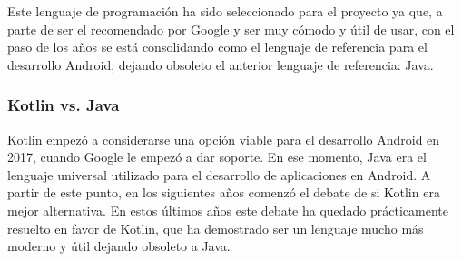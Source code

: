 Este lenguaje de programación ha sido seleccionado para el proyecto ya que, a parte de ser el recomendado por Google y ser muy cómodo y útil de usar, con el paso de los años se está consolidando como el lenguaje de referencia para el desarrollo Android, dejando obsoleto el anterior lenguaje de referencia: Java.
\subsubsection{Kotlin vs. Java}
\label{subsec:kotlinvsjava}
Kotlin empezó a considerarse una opción viable para el desarrollo Android en 2017, cuando Google le empezó a dar soporte. En ese momento, Java era el lenguaje universal utilizado para el desarrollo de aplicaciones en Android. A partir de este punto, en los siguientes años comenzó el debate de si Kotlin era mejor alternativa. En estos últimos años este debate ha quedado prácticamente resuelto en favor de Kotlin, que ha demostrado ser un lenguaje mucho más moderno y útil dejando obsoleto a Java.

